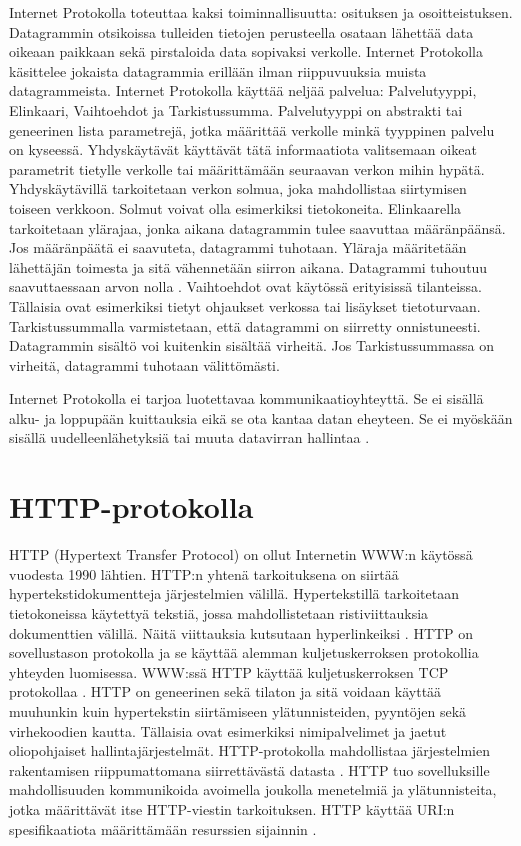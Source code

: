 \documentclass[utf8]{gradu3}
\begin{document}
Internet Protokolla toteuttaa kaksi toiminnallisuutta: osituksen ja osoitteistuksen. Datagrammin otsikoissa tulleiden tietojen perusteella osataan lähettää data oikeaan paikkaan sekä pirstaloida data sopivaksi verkolle. Internet Protokolla käsittelee jokaista datagrammia erillään ilman riippuvuuksia muista datagrammeista. Internet Protokolla käyttää neljää palvelua: Palvelutyyppi, Elinkaari, Vaihtoehdot ja Tarkistussumma. Palvelutyyppi on abstrakti tai geneerinen lista parametrejä, jotka määrittää verkolle minkä tyyppinen palvelu on kyseessä. Yhdyskäytävät käyttävät tätä informaatiota valitsemaan oikeat parametrit tietylle verkolle tai määrittämään seuraavan verkon mihin hypätä. Yhdyskäytävillä tarkoitetaan verkon solmua, joka mahdollistaa siirtymisen toiseen verkkoon. Solmut voivat olla esimerkiksi tietokoneita. Elinkaarella tarkoitetaan ylärajaa, jonka aikana datagrammin tulee saavuttaa määränpäänsä. Jos määränpäätä ei saavuteta, datagrammi tuhotaan. Yläraja määritetään lähettäjän toimesta ja sitä vähennetään siirron aikana. Datagrammi tuhoutuu saavuttaessaan arvon nolla \parencite{internet_protocol}. Vaihtoehdot ovat käytössä erityisissä tilanteissa. Tällaisia ovat esimerkiksi tietyt ohjaukset verkossa tai lisäykset tietoturvaan. Tarkistussummalla varmistetaan, että datagrammi on siirretty onnistuneesti. Datagrammin sisältö voi kuitenkin sisältää virheitä. Jos Tarkistussummassa on virheitä, datagrammi tuhotaan välittömästi. 

Internet Protokolla ei tarjoa luotettavaa kommunikaatioyhteyttä. Se ei sisällä alku- ja loppupään kuittauksia eikä se ota kantaa datan eheyteen. Se ei myöskään sisällä uudelleenlähetyksiä tai muuta datavirran hallintaa \parencite{internet_protocol}.


\section{HTTP-protokolla}
HTTP (Hypertext Transfer Protocol) on ollut Internetin WWW:n käytössä vuodesta 1990 lähtien. HTTP:n yhtenä tarkoituksena on siirtää hypertekstidokumentteja järjestelmien välillä. Hypertekstillä tarkoitetaan tietokoneissa käytettyä tekstiä, jossa mahdollistetaan ristiviittauksia dokumenttien välillä. Näitä viittauksia kutsutaan hyperlinkeiksi \parencite{hypertext}. HTTP on sovellustason protokolla ja se käyttää alemman kuljetuskerroksen protokollia yhteyden luomisessa. WWW:ssä HTTP käyttää kuljetuskerroksen TCP protokollaa \parencite{w3http}. HTTP on geneerinen sekä tilaton ja sitä voidaan käyttää muuhunkin kuin hypertekstin siirtämiseen ylätunnisteiden, pyyntöjen sekä virhekoodien kautta. Tällaisia ovat esimerkiksi nimipalvelimet ja jaetut oliopohjaiset hallintajärjestelmät. HTTP-protokolla mahdollistaa järjestelmien rakentamisen riippumattomana siirrettävästä datasta \parencite{http}. HTTP tuo sovelluksille mahdollisuuden kommunikoida avoimella joukolla menetelmiä ja ylätunnisteita, jotka määrittävät itse HTTP-viestin tarkoituksen. HTTP käyttää URI:n spesifikaatiota määrittämään resurssien sijainnin \parencite{uri}.
\end{document}
